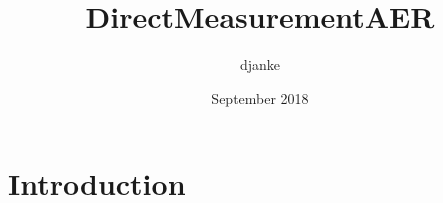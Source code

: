 \documentclass{article}
\title{DirectMeasurementAER}
\author{djanke }
\date{September 2018}
\begin{document}
\maketitle

\section{Introduction}
\end{document}
